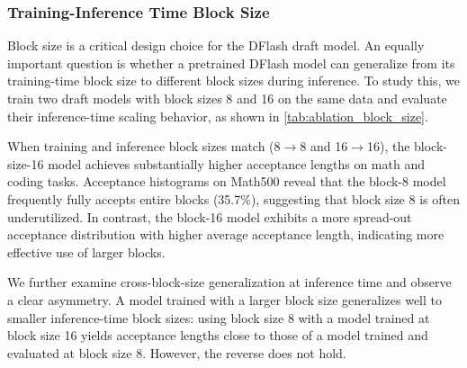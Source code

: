 \subsubsection{Training-Inference Time Block Size}
\begin{table}[h]
\centering
\renewcommand{\arraystretch}{0.9}
\caption{Ablation study of training–inference block size (BS) mismatch. All draft models use 8 layers and 5 target hidden features.}
\label{tab:ablation_block_size}
\end{table}
Block size is a critical design choice for the DFlash draft model. An equally important question is whether a pretrained DFlash model can generalize from its training-time block size to different block sizes during inference. To study this, we train two draft models with block sizes 8 and 16 on the same data and evaluate their inference-time scaling behavior, as shown in \autoref{tab:ablation_block_size}.

When training and inference block sizes match (8$\rightarrow$8 and 16$\rightarrow$16), the block-size-16 model achieves substantially higher acceptance lengths on math and coding tasks. Acceptance histograms on Math500 reveal that the block-8 model frequently fully accepts entire blocks (35.7\%), suggesting that block size 8 is often underutilized. In contrast, the block-16 model exhibits a more spread-out acceptance distribution with higher average acceptance length, indicating more effective use of larger blocks.

We further examine cross-block-size generalization at inference time and observe a clear asymmetry. A model trained with a larger block size generalizes well to smaller inference-time block sizes: using block size 8 with a model trained at block size 16 yields acceptance lengths close to those of a model trained and evaluated at block size 8. However, the reverse does not hold.

